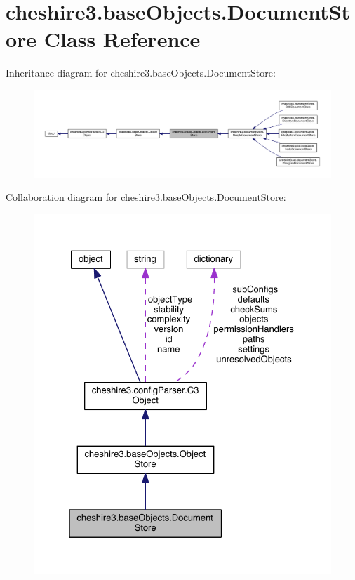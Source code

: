 \hypertarget{classcheshire3_1_1base_objects_1_1_document_store}{\section{cheshire3.\-base\-Objects.\-Document\-Store Class Reference}
\label{classcheshire3_1_1base_objects_1_1_document_store}
}


Inheritance diagram for cheshire3.\-base\-Objects.\-Document\-Store\-:
\nopagebreak
\begin{figure}[H]
\begin{center}
\leavevmode
\includegraphics[width=350pt]{classcheshire3_1_1base_objects_1_1_document_store__inherit__graph}
\end{center}
\end{figure}


Collaboration diagram for cheshire3.\-base\-Objects.\-Document\-Store\-:
\nopagebreak
\begin{figure}[H]
\begin{center}
\leavevmode
\includegraphics[width=327pt]{classcheshire3_1_1base_objects_1_1_document_store__coll__graph}
\end{center}
\end{figure}
